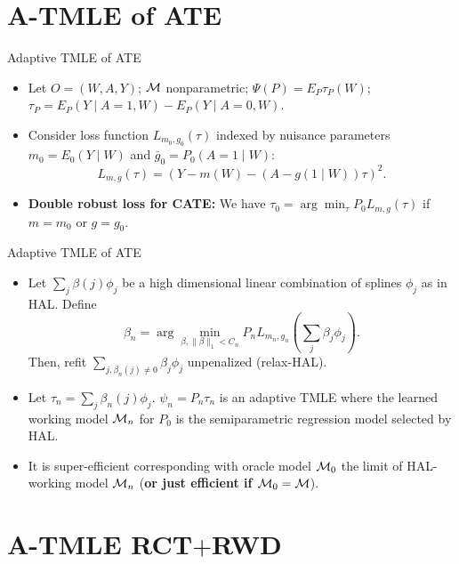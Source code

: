 \documentclass[t]{beamer}
\newcommand{\pl}{\parallel}
\begin{document}
\section{A-TMLE of ATE}
\begin{frame}{Adaptive TMLE of ATE}
\begin{itemize}
\item Let $O=(W,A,Y)$; ${\cal M}$ nonparametric; $\Psi(P)=E_P\tau_P(W)$; $\tau_P=E_P(Y\mid A=1,W)-E_P(Y\mid A=0,W)$.
\item Consider loss function $L_{m_0,g_0}(\tau)$ indexed by nuisance parameters $m_0=E_0(Y\mid W)$ and $\bar{g}_0=P_0(A=1\mid W)$:
\[
L_{m,g}(\tau)=\left( Y-m(W)-(A-g(1\mid W))\tau\right)^2.\]
\item {\bf Double robust loss for CATE:} We have $\tau_0=\arg\min_{\tau}P_0 L_{m,g}(\tau)$ if $m=m_0$ or $g=g_0$. 
\end{itemize}
\end{frame}
\begin{frame}{Adaptive TMLE of ATE}
\begin{itemize}
\item Let $\sum_j\beta(j)\phi_j$ be a high dimensional linear combination of splines $\phi_j$ as in HAL. Define
\[
\beta_n=\arg\min_{\beta,\pl\beta\pl_1<C_n}P_n L_{m_n,g_n}\left(\sum_j \beta_j\phi_j\right).\]
Then, refit $\sum_{j,\beta_n(j)\not =0}\beta_j\phi_j$ unpenalized (relax-HAL). 
\item Let $\tau_n=\sum_j\beta_n(j)\phi_j$.  $\psi_n=P_n \tau_n$ is an adaptive TMLE  where the learned working model ${\cal M}_n$ for $P_0$ is the semiparametric regression model selected by HAL. 
\item It is super-efficient corresponding with oracle model ${\cal M}_0$ the limit of HAL-working model ${\cal M}_n$ ({\bf or just efficient if ${\cal M}_0={\cal M}$}).
\end{itemize}
\end{frame}
\section{A-TMLE RCT$+$RWD}
\end{document}
